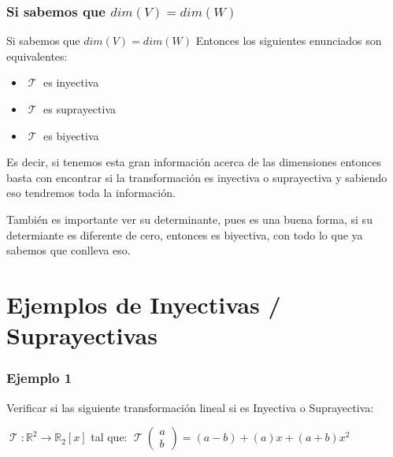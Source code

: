 \documentclass[12pt]{report}                                    %
\DeclareMathOperator \LinealTransformation {\mathcal{T}}        %
\newcommand{\pVector}[1]{                                       %
        \ensuremath{\begin{pmatrix}#1\end{pmatrix}}                 %
    }
\begin{document}
            \subsubsection{Si sabemos que $dim(V) = dim(W)$}

                Si sabemos que $dim(V) = dim(W)$
                Entonces los siguientes enunciados son equivalentes:
                \begin{itemize}
                    \item $\LinealTransformation$ es inyectiva
                    \item $\LinealTransformation$ es suprayectiva
                    \item $\LinealTransformation$ es biyectiva
                \end{itemize}

                Es decir, si tenemos esta gran información acerca de las dimensiones
                entonces basta con encontrar si la transformación es inyectiva o suprayectiva
                y sabiendo eso tendremos toda la información.

                También es importante ver su determinante, pues es una buena forma, si su determiante
                es diferente de cero, entonces es biyectiva, con todo lo que ya sabemos que conlleva eso.





    \clearpage
    \section{Ejemplos de Inyectivas / Suprayectivas}


            \subsubsection{\large Ejemplo 1}
            Verificar si las siguiente transformación lineal si es Inyectiva o Suprayectiva:

            $\LinealTransformation : \mathbb{R}^2 \to \mathbb{R}_2[x]$ tal que: 
            $\LinealTransformation \pVector{a\\b} = (a-b) + (a)x + (a+b)x^2$
\end{document}
